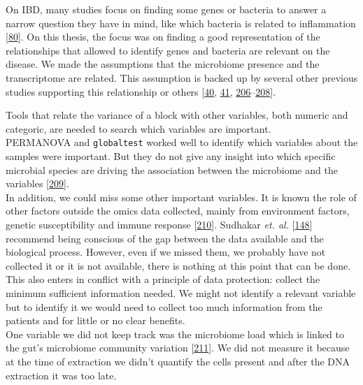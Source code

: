 \documentclass[
  a4paper,
]{book}
\begin{document}
On IBD, many studies focus on finding some genes or bacteria to answer a narrow question they have in mind, like which bacteria is related to inflammation {[}\protect\hyperlink{ref-tang2017}{80}{]}. On this thesis, the focus was on finding a good representation of the relationships that allowed to identify genes and bacteria are relevant on the disease. We made the assumptions that the microbiome presence and the transcriptome are related. This assumption is backed up by several other previous studies supporting this relationship or others {[}\protect\hyperlink{ref-thomas1998}{40}, \protect\hyperlink{ref-cornish2008}{41}, \protect\hyperlink{ref-holmes2012}{206}--\protect\hyperlink{ref-brand2021}{208}{]}.

Tools that relate the variance of a block with other variables, both numeric and categoric, are needed to search which variables are important.\\
PERMANOVA and \texttt{globaltest} worked well to identify which variables about the samples were important.
But they do not give any insight into which specific microbial species are driving the association between the microbiome and the variables {[}\protect\hyperlink{ref-susin2020}{209}{]}.\\
In addition, we could miss some other important variables.
It is known the role of other factors outside the omics data collected, mainly from environment factors, genetic susceptibility and immune response {[}\protect\hyperlink{ref-sartor2006}{210}{]}.
Sudhakar \emph{et. al.} {[}\protect\hyperlink{ref-sudhakar2022}{148}{]} recommend being conscious of the gap between the data available and the biological process.
However, even if we missed them, we probably have not collected it or it is not available, there is nothing at this point that can be done.
This also enters in conflict with a principle of data protection: collect the minimum sufficient information needed.
We might not identify a relevant variable but to identify it we would need to collect too much information from the patients and for little or no clear benefits.\\
One variable we did not keep track was the microbiome load which is linked to the gut's microbiome community variation {[}\protect\hyperlink{ref-vandeputte2017}{211}{]}.
We did not measure it because at the time of extraction we didn't quantify the cells present and after the DNA extraction it was too late.
\end{document}
